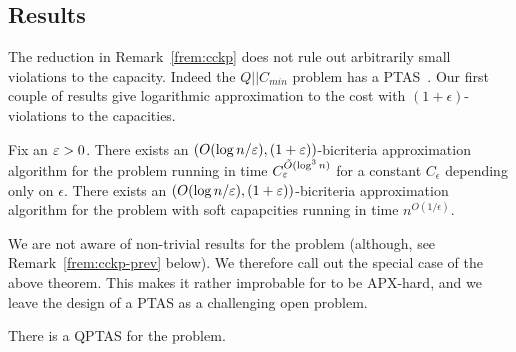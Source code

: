 \subsection{Results}
The reduction in Remark~\ref{frem:cckp} does not rule out arbitrarily small violations to the capacity. Indeed the $Q||C_{min}$ problem has a PTAS~\cite{AzarE98}.
Our first couple of results give logarithmic approximation to the cost with $(1+\epsilon)$-violations to the capacities.
\begin{theorem}\label{fthm:1}
	Fix an $\varepsilon > 0$. There exists an $(O(\log n/\varepsilon), (1+\varepsilon))$-bicriteria approximation algorithm for the \mckc problem running in time $C_\varepsilon^{\tilde{O}(\log^3n)}$ for a constant $C_\epsilon$ depending only on $\epsilon$. There exists an $(O(\log n/\varepsilon), (1+\varepsilon))$-bicriteria approximation algorithm for the \mckc problem with soft capapcities running in time $n^{O(1/\epsilon)}$.
\end{theorem}
We are not aware of non-trivial results for the \cckp problem (although, see Remark~\ref{frem:cckp-prev} below). We therefore call out the special case of the above theorem.
This makes it rather improbable for \cckp to be APX-hard, and we leave the design of a PTAS as a challenging open problem.
\begin{theorem}\label{fthm:q}
	There is a QPTAS for the \cckp problem.
\end{theorem}

